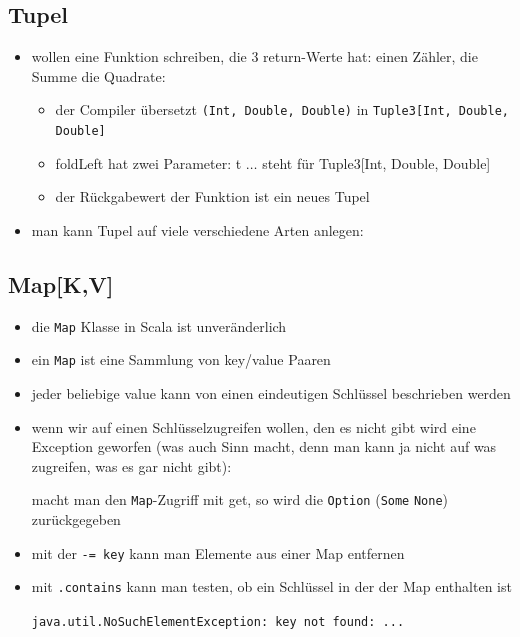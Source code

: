 \subsection{Tupel}
\begin{itemize}
  \item wollen eine Funktion schreiben, die 3 return-Werte hat: einen Zähler, die Summe \und die Quadrate:
  
  
  
  \begin{itemize}
    \item der Compiler übersetzt \texttt{(Int, Double, Double)} in
    \texttt{Tuple3[Int, Double, Double]}
    \item foldLeft hat zwei Parameter: t $\ldots$ steht für Tuple3[Int, Double, Double]
    \item der Rückgabewert der Funktion ist ein neues Tupel
  \end{itemize}
  \item man kann Tupel auf viele verschiedene Arten anlegen:
  
  
\end{itemize}


\subsection{Map[K,V]}
\begin{itemize}
  \item die \texttt{Map} Klasse in Scala ist unveränderlich  \item ein \texttt{Map} ist eine Sammlung von key/value Paaren
  \item jeder beliebige value kann von einen eindeutigen Schlüssel
  beschrieben werden
  
  
  
  \item wenn wir auf einen Schlüsselzugreifen wollen, den es nicht
  gibt wird eine Exception geworfen (was auch Sinn macht, denn man
  kann ja nicht auf was zugreifen, was es gar nicht gibt):
 
  
  macht man den \texttt{Map}-Zugriff mit get, so wird die 
  \texttt{Option} (\texttt{Some} \oder \texttt{None}) zurückgegeben
  \item mit der \texttt{-= key} kann man Elemente aus einer Map entfernen
  \item mit \texttt{.contains} kann man testen, ob ein Schlüssel in der
  der Map enthalten ist
  
  \texttt{java.util.NoSuchElementException: key not found: ...}
\end{itemize}


